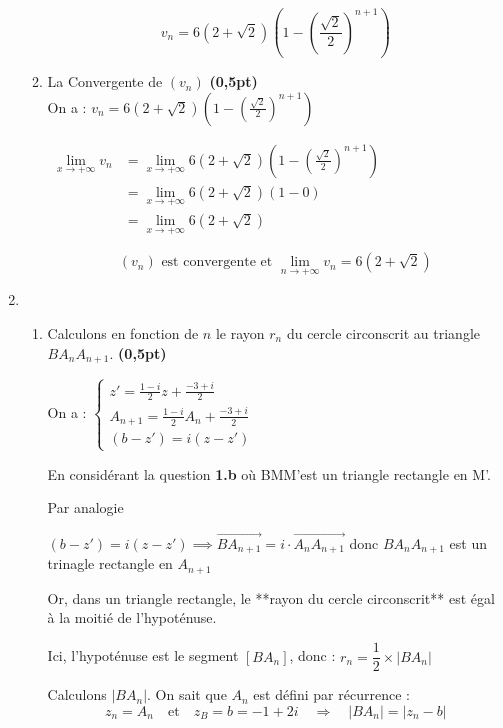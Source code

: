 \documentclass[12pt,a4paper]{article}
\begin{document}
\begin{enumerate}
\begin{enumerate}
\begin{resultbox}
\[
\boxed{
v_n = 6(2 + \sqrt{2})\left(1 - \left( \frac{\sqrt{2}}{2} \right)^{n+1} \right)
}
\]
\end{resultbox}

\item La Convergente de \( (v_n) \) \hfill \textbf{(0,5pt)}\\

On a :
\(
v_n = 6(2 + \sqrt{2})\left(1 - \left( \frac{\sqrt{2}}{2} \right)^{n+1} \right)
\)

\(
\begin{aligned}
    \lim\limits_{x\to +\infty} v_n &= \lim\limits_{x\to +\infty} 6(2 + \sqrt{2})\left(1 - \left( \frac{\sqrt{2}}{2} \right)^{n+1} \right)\\
    &=\lim\limits_{x\to +\infty} 6(2 + \sqrt{2})\left(1 - 0 \right)\\
    &=\lim\limits_{x\to +\infty} 6(2 + \sqrt{2})
\end{aligned}
\)

\begin{resultbox}
\[
\boxed{
(v_n) \text{ est convergente et } \lim\limits_{n \to +\infty} v_n = 6(2 + \sqrt{2})
}
\]
\end{resultbox}

\end{enumerate}

    \item 
    \begin{enumerate}
        \item Calculons en fonction de \( n \) le rayon \( r_n \) du cercle circonscrit au triangle \( B A_n A_{n+1} \). \hfill \textbf{(0,5pt)}

        On a : 
        \(
        \begin{cases}
            z' = \frac{1 - i}{2}z + \frac{-3 + i}{2}\\
            A_{n+1}= \frac{1 - i}{2}A_n + \frac{-3 + i}{2}\\
            (b-z')=i(z-z')
        \end{cases}
        \) 

        En considérant la question \textbf{1.b} où BMM'est un triangle rectangle en M'.

        Par analogie
        
        \( (b-z')=i(z-z') \implies \overrightarrow{BA_{n+1}} = i \cdot \overrightarrow{A_n A_{n+1}}\) donc
        \( B A_n A_{n+1} \) est un trinagle rectangle en  \( A_{n+1} \)
        
Or, dans un triangle rectangle, le **rayon du cercle circonscrit** est égal à la moitié de l’hypoténuse.

Ici, l’hypoténuse est le segment \( [B A_n] \), donc :  \(r_n = \dfrac{1}{2} \times |B A_n|\)

Calculons \( |B A_n| \). On sait que \( A_n \) est défini par récurrence :
\[
z_{n} = A_n
\quad \text{et} \quad z_B = b = -1 + 2i
\quad \Rightarrow \quad |B A_n| = |z_n - b|
\]

    \end{enumerate}

\end{enumerate}
\end{document}

